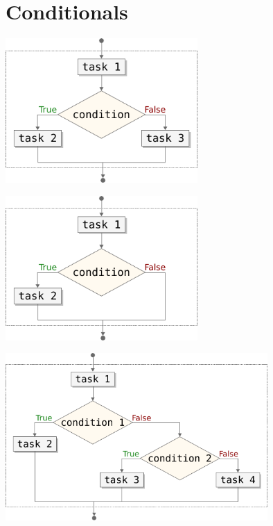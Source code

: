 \documentclass[aspectratio=1610,t]{beamer}
\begin{document}
\section{Conditionals}
\begin{pframe}
 \begin{center}
   \includegraphics[width=0.55\textwidth]{../../images/flow_conditional.pdf}
 \end{center}
\end{pframe}

\begin{pframe}
 \begin{center}
   \includegraphics[width=0.55\textwidth]{../../images/flow_conditional_if_only.pdf}
 \end{center}
\end{pframe}

\begin{pframe}
 \begin{center}
   \includegraphics[width=0.75\textwidth]{../../images/flow_conditional_chained_if.pdf}
 \end{center}
\end{pframe}
\end{document}
